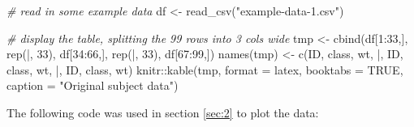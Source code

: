 \documentclass[smallextended]{svjour3}       %
\newenvironment{Shaded}{\begin{snugshade}}{\end{snugshade}}
\newcommand{\AttributeTok}[1]{\textcolor[rgb]{0.77,0.63,0.00}{#1}}
\newcommand{\CommentTok}[1]{\textcolor[rgb]{0.56,0.35,0.01}{\textit{#1}}}
\newcommand{\ConstantTok}[1]{\textcolor[rgb]{0.00,0.00,0.00}{#1}}
\newcommand{\DecValTok}[1]{\textcolor[rgb]{0.00,0.00,0.81}{#1}}
\newcommand{\FunctionTok}[1]{\textcolor[rgb]{0.00,0.00,0.00}{#1}}
\newcommand{\NormalTok}[1]{#1}
\newcommand{\OtherTok}[1]{\textcolor[rgb]{0.56,0.35,0.01}{#1}}
\newcommand{\SpecialCharTok}[1]{\textcolor[rgb]{0.00,0.00,0.00}{#1}}
\newcommand{\StringTok}[1]{\textcolor[rgb]{0.31,0.60,0.02}{#1}}
\begin{document}
\begin{Shaded}
\begin{Highlighting}[]
\CommentTok{\# read in some example data}
\NormalTok{df }\OtherTok{\textless{}{-}} \FunctionTok{read\_csv}\NormalTok{(}\StringTok{"example{-}data{-}1.csv"}\NormalTok{)}

\CommentTok{\# display the table, splitting the 99 rows into 3 cols wide}
\NormalTok{tmp }\OtherTok{\textless{}{-}} \FunctionTok{cbind}\NormalTok{(df[}\DecValTok{1}\SpecialCharTok{:}\DecValTok{33}\NormalTok{,], }\FunctionTok{rep}\NormalTok{(}\StringTok{\textquotesingle{}|\textquotesingle{}}\NormalTok{, }\DecValTok{33}\NormalTok{), }
\NormalTok{             df[}\DecValTok{34}\SpecialCharTok{:}\DecValTok{66}\NormalTok{,], }\FunctionTok{rep}\NormalTok{(}\StringTok{\textquotesingle{}|\textquotesingle{}}\NormalTok{, }\DecValTok{33}\NormalTok{), }
\NormalTok{             df[}\DecValTok{67}\SpecialCharTok{:}\DecValTok{99}\NormalTok{,])}
\FunctionTok{names}\NormalTok{(tmp) }\OtherTok{\textless{}{-}} \FunctionTok{c}\NormalTok{(}\StringTok{\textquotesingle{}ID\textquotesingle{}}\NormalTok{, }\StringTok{\textquotesingle{}class\textquotesingle{}}\NormalTok{, }\StringTok{\textquotesingle{}wt\textquotesingle{}}\NormalTok{, }\StringTok{\textquotesingle{}|\textquotesingle{}}\NormalTok{, }\StringTok{\textquotesingle{}ID\textquotesingle{}}\NormalTok{, }\StringTok{\textquotesingle{}class\textquotesingle{}}\NormalTok{, }\StringTok{\textquotesingle{}wt\textquotesingle{}}\NormalTok{, }
                \StringTok{\textquotesingle{}|\textquotesingle{}}\NormalTok{, }\StringTok{\textquotesingle{}ID\textquotesingle{}}\NormalTok{, }\StringTok{\textquotesingle{}class\textquotesingle{}}\NormalTok{, }\StringTok{\textquotesingle{}wt\textquotesingle{}}\NormalTok{)}
\NormalTok{knitr}\SpecialCharTok{::}\FunctionTok{kable}\NormalTok{(tmp, }\AttributeTok{format =} \StringTok{\textquotesingle{}latex\textquotesingle{}}\NormalTok{, }\AttributeTok{booktabs =} \ConstantTok{TRUE}\NormalTok{, }
             \AttributeTok{caption =} \StringTok{"Original subject data"}\NormalTok{)}
\end{Highlighting}
\end{Shaded}

The following code was used in section \ref{sec:2} to plot the data:
\end{document}

